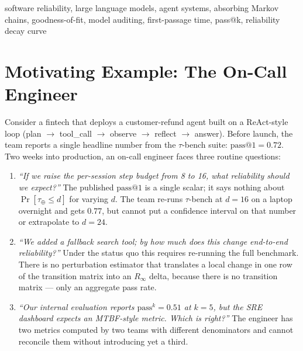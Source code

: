 \documentclass[conference]{IEEEtran}
\begin{document}
\begin{IEEEkeywords}
software reliability, large language models, agent systems,
absorbing Markov chains, goodness-of-fit, model auditing, first-passage time,
pass@k, reliability decay curve
\end{IEEEkeywords}




\iffalse
\section{Motivating Example: The On-Call Engineer}
\label{sec:motivating}

Consider a fintech that deploys a customer-refund agent built on a ReAct-style loop (plan $\to$ tool\_call $\to$ observe $\to$ reflect $\to$ answer). Before launch, the team reports a single headline number from the $\tau$-bench suite: $\mathrm{pass}@1 = 0.72$. Two weeks into production, an on-call engineer faces three routine questions:

\begin{enumerate}
    \item \emph{``If we raise the per-session step budget from 8 to 16, what reliability should we expect?''} The published $\mathrm{pass}@1$ is a single scalar; it says nothing about $\Pr[\tau_\oplus \leq d]$ for varying $d$. The team re-runs $\tau$-bench at $d{=}16$ on a laptop overnight and gets $0.77$, but cannot put a confidence interval on that number or extrapolate to $d{=}24$.

    \item \emph{``We added a fallback search tool; by how much does this change end-to-end reliability?''} Under the status quo this requires re-running the full benchmark. There is no perturbation estimator that translates a local change in one row of the transition matrix into an $R_\infty$ delta, because there is no transition matrix --- only an aggregate pass rate.

    \item \emph{``Our internal evaluation reports $\mathrm{pass}^k = 0.51$ at $k{=}5$, but the SRE dashboard expects an MTBF-style metric. Which is right?''} The engineer has two metrics computed by two teams with different denominators and cannot reconcile them without introducing yet a third.
\end{enumerate}
\end{document}

